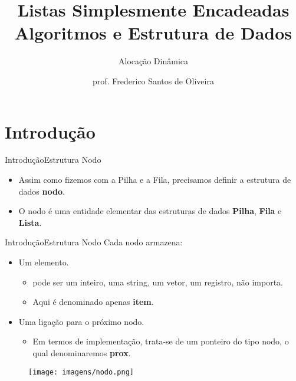 \documentclass[aspectratio=169]{beamer}
\title[Aula Prática Listas]{Listas Simplesmente Encadeadas\\
   Algoritmos e Estrutura de Dados}
\subtitle{Alocação Dinâmica}
\author[Frederico Santos de Oliveira]{prof. Frederico Santos de Oliveira}
\institute[UFMT]{Universidade Federal de Mato Grosso\\ Instituto de Engenharia}
\date{}
\begin{document}

\begin{frame}[plain]
  \titlepage
\end{frame}

%


\section{Introdução}

\begin{frame}{Introdução}{Estrutura Nodo}
\begin{itemize}
 \item Assim como fizemos com a Pilha e a Fila, precisamos definir a estrutura de dados {\bf nodo}.
 \item O nodo é uma entidade elementar das estruturas de dados {\bf Pilha}, {\bf Fila} e {\bf Lista}. 
\end{itemize}
\end{frame}


\begin{frame}{Introdução}{Estrutura Nodo}
Cada nodo armazena:
\begin{itemize}
 \item Um elemento.
  \begin{itemize}
  \item pode ser um inteiro, uma string, um vetor, um registro, não importa. 
  \item Aqui é denominado apenas {\bf item}.
  \end{itemize}  
 \item Uma ligação para o próximo nodo. 
 \begin{itemize}
 \item Em termos de implementação, trata-se de um ponteiro do tipo nodo, o qual denominaremos {\bf prox}.
 \end{itemize}
 \end{itemize}
\begin{figure}[!h]
  \centering
   \texttt{[image: imagens/nodo.png]}
  \label{fig_introducao}
\end{figure}
\end{frame}
\end{document}
